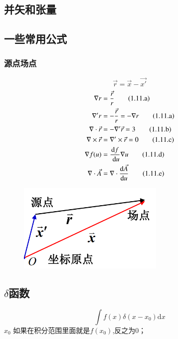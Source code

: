 \documentclass[twocolumn]{ctexart}
\begin{document}
        \subsection{并矢和张量}
\subsection{一些常用公式}
\subsubsection{源点场点}
\begin{equation}
\vec{r}=\vec{x}-\vec{x'}\tag{1.10}
\end{equation}
\begin{align}
\nabla r&= \frac{\vec{r}}{r}\tag{1.11.a} \\
\nabla' r &=-\frac{\vec{r}}{r}=-\nabla r\tag{1.11.a} \\
\nabla \cdot \vec{r}&=-\nabla'\vec{r}=3\tag{1.11.b} \\
\nabla \times \vec{r}&=\nabla'\times \vec{r}=0\tag{1.11.c} \\
\nabla f(u)&=\frac{\mathrm{d}{f}}{ \hspace{0.1cm} \mathrm{d}{u}}\nabla u \tag{1.11.d} \\ 
\nabla \cdot \vec{A}&=\nabla \cdot \frac{\mathrm{d}{\vec{A}}}{\mathrm{d}{u}}
\tag{1.11.e} 
\end{align}

        \begin{figure}[H]
            \centering
            \includegraphics[width=7cm]{img/1.4.png}
            \end{figure}
\subsection{$\delta$函数}
\begin{equation}
  \int{}f(x)\delta(x-x_0)\mathrm{d}x \tag{1.12}
\end{equation}
$x_0$ 如果在积分范围里面就是$f(x_0)$,反之为0； 
\end{document}
